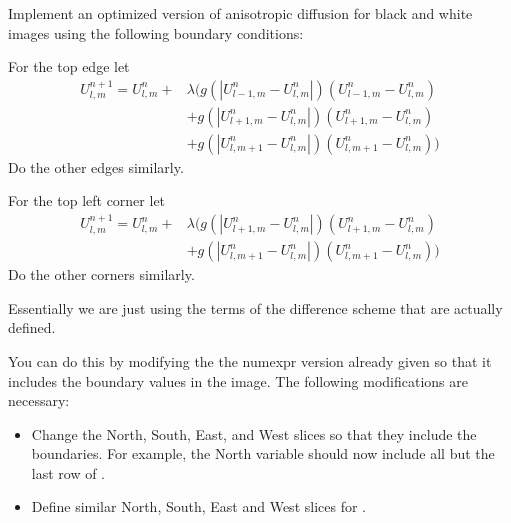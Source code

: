 \begin{comment}
\begin{problem}
Implement the above finite difference scheme for black and white images.
Leave the boundaries constant this time and just iterate over the interior of the image.
You may use either of the two functions listed for $g$.
One possible way to do these problems is to iterate over the array and operate in place.
\end{problem}
\end{comment}

\begin{problem}
Implement an optimized version of anisotropic diffusion for black and white images using the following boundary conditions:

For the top edge let 
\begin{align*}
U_{l,m}^{n+1} = U_{l,m}^n + & \lambda (g(|U_{l-1,m}^n - U_{l,m}^n|)(U_{l-1,m}^n - U_{l,m}^n) \\
					& + g(|U_{l+1,m}^n - U_{l,m}^n|)(U_{l+1,m}^n - U_{l,m}^n) \\
					& + g(|U_{l,m+1}^n - U_{l,m}^n|)(U_{l,m+1}^n - U_{l,m}^n))
\end{align*}
Do the other edges similarly.

For the top left corner let
\begin{align*}
U_{l,m}^{n+1} = U_{l,m}^n + & \lambda (g(|U_{l+1,m}^n - U_{l,m}^n|)(U_{l+1,m}^n - U_{l,m}^n) \\
					& + g(|U_{l,m+1}^n - U_{l,m}^n|)(U_{l,m+1}^n - U_{l,m}^n))
\end{align*}
Do the other corners similarly.

Essentially we are just using the terms of the difference scheme that are actually defined.

You can do this by modifying the the numexpr version already given so that it includes the boundary values in the image.
The following modifications are necessary:
\begin{itemize}

\item Change the North, South, East, and West slices so that they include the boundaries.
For example, the North variable should now include all but the last row of .

\item Define similar North, South, East and West slices for .


\end{itemize}
\end{problem}

